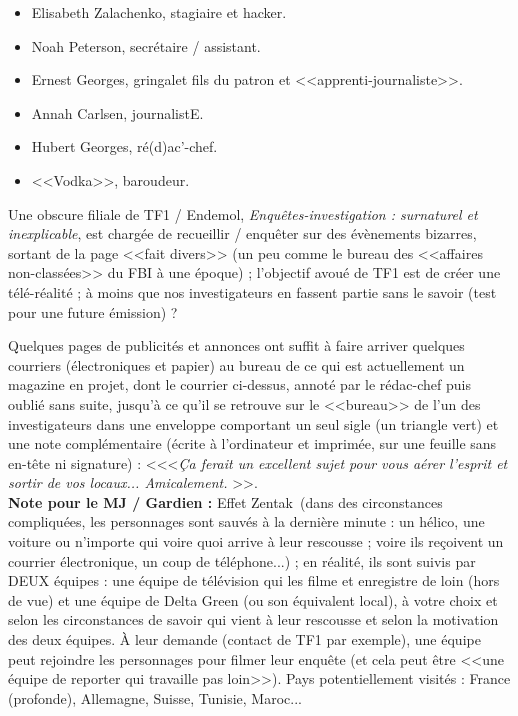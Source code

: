\documentclass[11pt,twoside,a4paper]{article}
\begin{document}
\begin{minipage}[ht]{0.50\textwidth}
	\begin{itemize}
		\item Elisabeth Zalachenko, stagiaire et hacker. 
		\item Noah Peterson, secr{\'e}taire / assistant. 
		\item Ernest Georges, gringalet fils du patron et <<apprenti-journaliste>>. 
		\item Annah Carlsen, journalistE. 
		\item Hubert Georges, r{\'e}(d)ac'-chef. 
		\item <<Vodka>>, baroudeur. 
	\end{itemize}
\end{minipage} \hfill \begin{minipage}[ht]{0.45\textwidth}
	Une obscure filiale de TF1 / Endemol, \emph{Enqu{\^e}tes-investigation : surnaturel et inexplicable}, est charg{\'e}e de recueillir / enqu{\^e}ter sur des {\'e}v{\`e}nements bizarres, sortant de la page <<fait divers>> (un peu comme le bureau des <<affaires non-class{\'e}es>> du FBI {\`a} une {\'e}poque) ; l'objectif avou{\'e} de TF1 est de cr{\'e}er une t{\'e}l{\'e}-r{\'e}alit{\'e} ; {\`a} moins que nos investigateurs en fassent partie sans le savoir (test pour une future {\'e}mission) ?~\\
\end{minipage}

	Quelques pages de publicit{\'e}s et annonces ont suffit {\`a} faire arriver quelques courriers ({\'e}lectroniques et papier) au bureau de ce qui est actuellement un magazine en projet, dont le courrier ci-dessus, annot{\'e} par le r{\'e}dac-chef puis oubli{\'e} sans suite, jusqu'{\`a} ce qu'il se retrouve sur le <<bureau>> de l'un des investigateurs dans une enveloppe comportant un seul sigle (un triangle vert) et une note compl{\'e}mentaire ({\'e}crite {\`a} l'ordinateur et imprim{\'e}e, sur une feuille sans en-t{\^e}te ni signature) : <<<\emph{\c{C}a ferait un excellent sujet pour vous a{\'e}rer l'esprit et sortir de vos locaux... Amicalement. }>>. ~\\
	
	\textbf{Note pour le MJ / Gardien : }Effet Zentak\texttrademark  ~(dans des circonstances compliqu{\'e}es, les personnages sont sauv{\'e}s {\`a} la derni{\`e}re minute : un h{\'e}lico, une voiture ou n'importe qui voire quoi arrive {\`a} leur rescousse ; voire ils re\c{c}oivent un courrier {\'e}lectronique, un coup de t{\'e}l{\'e}phone...) ; en r{\'e}alit{\'e}, ils sont suivis par DEUX {\'e}quipes : une {\'e}quipe de t{\'e}l{\'e}vision qui les filme et enregistre de loin (hors de vue) et une {\'e}quipe de Delta Green (ou son {\'e}quivalent local), {\`a} votre choix et selon les circonstances de savoir qui vient {\`a} leur rescousse et selon la motivation des deux {\'e}quipes. {\`A} leur demande (contact de TF1 par exemple), une {\'e}quipe peut rejoindre les personnages pour filmer leur enqu{\^e}te (et cela peut {\^e}tre <<une {\'e}quipe de reporter qui travaille pas loin>>). Pays potentiellement visit{\'e}s : France (profonde), Allemagne, Suisse, Tunisie, Maroc...~\\
	
\end{document}
